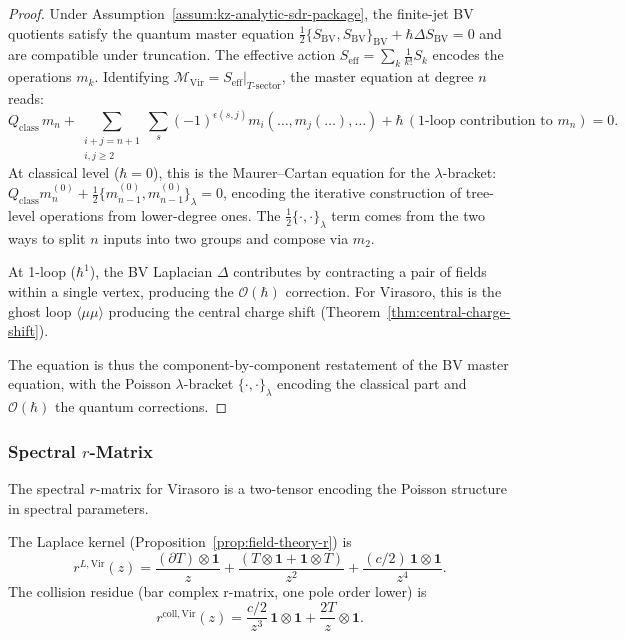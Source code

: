 \begin{proof}
Under Assumption~\ref{assum:kz-analytic-sdr-package}, the finite-jet
BV quotients satisfy the quantum master equation
$\tfrac{1}{2}\{S_{\mathrm{BV}}, S_{\mathrm{BV}}\}_{\mathrm{BV}}
+ \hbar\Delta S_{\mathrm{BV}} = 0$ and are compatible under
truncation. The effective action
$S_{\mathrm{eff}} = \sum_k \frac{1}{k!} S_k$ encodes the operations
$m_k$. Identifying
$\mathcal{M}_{\mathrm{Vir}} = S_{\mathrm{eff}}|_{T\text{-sector}}$,
the master equation at degree $n$ reads:
\[
Q_{\mathrm{class}}\, m_n + \sum_{\substack{i+j=n+1\\i,j\ge 2}} \sum_{s} (-1)^{\epsilon(s,j)} m_i(\ldots, m_j(\ldots), \ldots) + \hbar\,(\text{1-loop contribution to } m_n) = 0.
\]
At classical level ($\hbar = 0$), this is the Maurer--Cartan equation for the $\lambda$-bracket: $Q_{\mathrm{class}} m_n^{(0)} + \frac{1}{2}\{m_{n-1}^{(0)}, m_{n-1}^{(0)}\}_\lambda = 0$, encoding the iterative construction of tree-level operations from lower-degree ones. The $\frac{1}{2}\{\cdot, \cdot\}_\lambda$ term comes from the two ways to split $n$ inputs into two groups and compose via $m_2$.

At 1-loop ($\hbar^1$), the BV Laplacian $\Delta$ contributes by contracting a pair of fields within a single vertex, producing the $\mathcal{O}(\hbar)$ correction. For Virasoro, this is the ghost loop $\langle\mu\mu\rangle$ producing the central charge shift (Theorem~\ref{thm:central-charge-shift}).

The equation is thus the component-by-component restatement of the BV master equation, with the Poisson $\lambda$-bracket $\{\cdot, \cdot\}_\lambda$ encoding the classical part and $\mathcal{O}(\hbar)$ the quantum corrections.
\end{proof}

\subsubsection{Spectral $r$-Matrix}

The spectral $r$-matrix for Virasoro is a two-tensor encoding the Poisson structure in spectral parameters.

\begin{definition}
The Laplace kernel (Proposition~\ref{prop:field-theory-r}) is
\begin{equation}
r^{L,\text{Vir}}(z)
= \frac{(\partial T) \otimes \mathbf{1}}{z}
+ \frac{(T \otimes \mathbf{1} + \mathbf{1} \otimes T)}{z^2}
+ \frac{(c/2)\,\mathbf{1} \otimes \mathbf{1}}{z^4}.
\end{equation}
The collision residue (bar complex r-matrix, one pole order lower)
is
\begin{equation}
r^{\mathrm{coll},\text{Vir}}(z) = \frac{c/2}{z^3}\,\mathbf{1}\otimes\mathbf{1} + \frac{2T}{z}\otimes\mathbf{1}.
\end{equation}
\end{definition}

